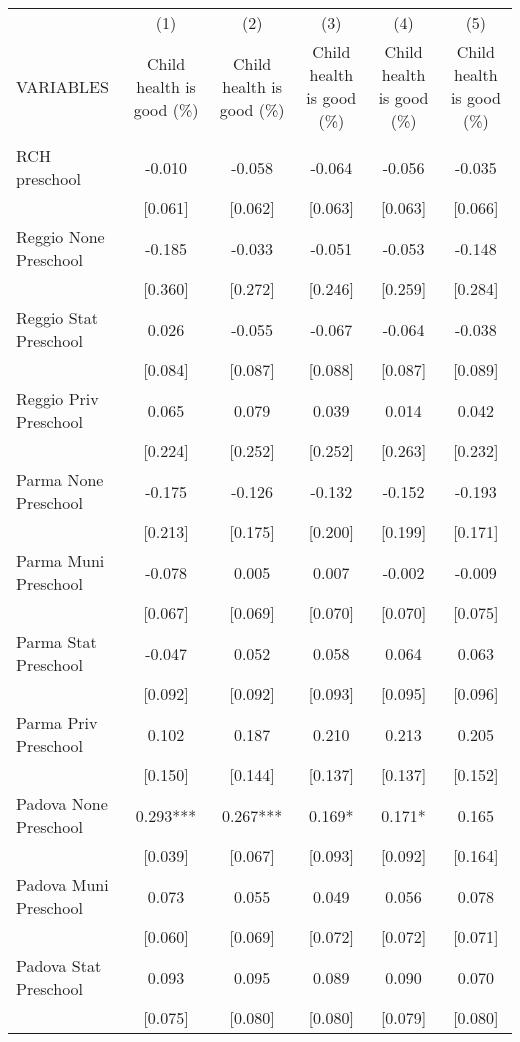 \begin{tabular}{lccccc} \hline
 & (1) & (2) & (3) & (4) & (5) \\
VARIABLES & Child health is good (\%) & Child health is good (\%) & Child health is good (\%) & Child health is good (\%) & Child health is good (\%) \\ \hline
 &  &  &  &  &  \\
RCH preschool & -0.010 & -0.058 & -0.064 & -0.056 & -0.035 \\
 & [0.061] & [0.062] & [0.063] & [0.063] & [0.066] \\
Reggio None Preschool & -0.185 & -0.033 & -0.051 & -0.053 & -0.148 \\
 & [0.360] & [0.272] & [0.246] & [0.259] & [0.284] \\
Reggio Stat Preschool & 0.026 & -0.055 & -0.067 & -0.064 & -0.038 \\
 & [0.084] & [0.087] & [0.088] & [0.087] & [0.089] \\
Reggio Priv Preschool & 0.065 & 0.079 & 0.039 & 0.014 & 0.042 \\
 & [0.224] & [0.252] & [0.252] & [0.263] & [0.232] \\
Parma None Preschool & -0.175 & -0.126 & -0.132 & -0.152 & -0.193 \\
 & [0.213] & [0.175] & [0.200] & [0.199] & [0.171] \\
Parma Muni Preschool & -0.078 & 0.005 & 0.007 & -0.002 & -0.009 \\
 & [0.067] & [0.069] & [0.070] & [0.070] & [0.075] \\
Parma Stat Preschool & -0.047 & 0.052 & 0.058 & 0.064 & 0.063 \\
 & [0.092] & [0.092] & [0.093] & [0.095] & [0.096] \\
Parma Priv Preschool & 0.102 & 0.187 & 0.210 & 0.213 & 0.205 \\
 & [0.150] & [0.144] & [0.137] & [0.137] & [0.152] \\
Padova None Preschool & 0.293*** & 0.267*** & 0.169* & 0.171* & 0.165 \\
 & [0.039] & [0.067] & [0.093] & [0.092] & [0.164] \\
Padova Muni Preschool & 0.073 & 0.055 & 0.049 & 0.056 & 0.078 \\
 & [0.060] & [0.069] & [0.072] & [0.072] & [0.071] \\
Padova Stat Preschool & 0.093 & 0.095 & 0.089 & 0.090 & 0.070 \\
 & [0.075] & [0.080] & [0.080] & [0.079] & [0.080] \\

\end{tabular}
